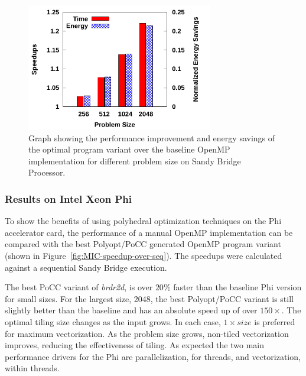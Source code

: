 \begin{figure}[bt]
    \includegraphics[width=3.2in]{speedup}
    \caption{Graph showing the performance improvement and energy savings of 
the optimal program variant over the baseline OpenMP implementation for 
different problem size on Sandy Bridge Processor.} 
    \label{fig:speedup}
\end{figure}

\subsubsection{Results on Intel Xeon Phi}
To show the benefits of using polyhedral optimization techniques on the Phi
accelerator card, the performance of a manual OpenMP implementation 
can be compared with the best Polyopt/PoCC generated OpenMP program variant (shown in Figure~\ref{fig:MIC-speedup-over-seq}).
The speedups were calculated against a sequential Sandy Bridge execution.

The best PoCC variant of \emph{brdr2d}, is over $20\%$ faster than the baseline Phi version for small sizes.
For the largest size, 2048, the best Polyopt/PoCC variant is still slightly better than the
baseline and has an absolute speed up of over $150\times$.
The optimal tiling size changes as the input grows. In each case, $1\times size$
is preferred for maximum vectorization. As the problem size grows, non-tiled
vectorization improves, reducing the effectiveness of tiling.
As expected the two main performance drivers for the Phi are 
parallelization, for threads, and vectorization, within threads.

